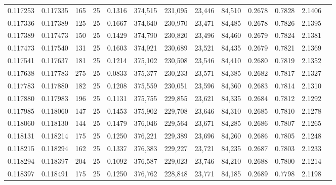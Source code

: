 \begin{tabular}{rrrrrrrrrrrrr}
0.117253 & 0.117335 &   165 &  25 &                                     0.1316 & 374,515 & 231,095 &  23,446 &  84,510 & 0.2678 & 0.7828 & 2.1406 \\
0.117336 & 0.117389 &   125 &  25 &                                     0.1667 & 374,640 & 230,970 &  23,471 &  84,485 & 0.2678 & 0.7826 & 2.1395 \\
0.117389 & 0.117473 &   150 &  25 &                                     0.1429 & 374,790 & 230,820 &  23,496 &  84,460 & 0.2679 & 0.7824 & 2.1381 \\
0.117473 & 0.117540 &   131 &  25 &                                     0.1603 & 374,921 & 230,689 &  23,521 &  84,435 & 0.2679 & 0.7821 & 2.1369 \\
0.117541 & 0.117637 &   181 &  25 &                                     0.1214 & 375,102 & 230,508 &  23,546 &  84,410 & 0.2680 & 0.7819 & 2.1352 \\
0.117638 & 0.117783 &   275 &  25 &                                     0.0833 & 375,377 & 230,233 &  23,571 &  84,385 & 0.2682 & 0.7817 & 2.1327 \\
0.117783 & 0.117880 &   182 &  25 &                                     0.1208 & 375,559 & 230,051 &  23,596 &  84,360 & 0.2683 & 0.7814 & 2.1310 \\
0.117880 & 0.117983 &   196 &  25 &                                     0.1131 & 375,755 & 229,855 &  23,621 &  84,335 & 0.2684 & 0.7812 & 2.1292 \\
0.117985 & 0.118060 &   147 &  25 &                                     0.1453 & 375,902 & 229,708 &  23,646 &  84,310 & 0.2685 & 0.7810 & 2.1278 \\
0.118060 & 0.118130 &   144 &  25 &                                     0.1479 & 376,046 & 229,564 &  23,671 &  84,285 & 0.2686 & 0.7807 & 2.1265 \\
0.118131 & 0.118214 &   175 &  25 &                                     0.1250 & 376,221 & 229,389 &  23,696 &  84,260 & 0.2686 & 0.7805 & 2.1248 \\
0.118215 & 0.118294 &   162 &  25 &                                     0.1337 & 376,383 & 229,227 &  23,721 &  84,235 & 0.2687 & 0.7803 & 2.1233 \\
0.118294 & 0.118397 &   204 &  25 &                                     0.1092 & 376,587 & 229,023 &  23,746 &  84,210 & 0.2688 & 0.7800 & 2.1214 \\
0.118397 & 0.118491 &   175 &  25 &                                     0.1250 & 376,762 & 228,848 &  23,771 &  84,185 & 0.2689 & 0.7798 & 2.1198 \\

\end{tabular}
